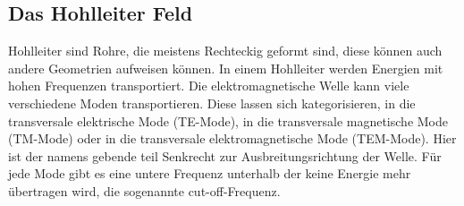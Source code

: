 \subsection{Das Hohlleiter Feld}
Hohlleiter sind Rohre, die meistens Rechteckig geformt sind, diese können auch andere Geometrien aufweisen können. In einem Hohlleiter werden Energien mit hohen Frequenzen transportiert. Die elektromagnetische Welle kann viele verschiedene Moden transportieren. Diese lassen sich kategorisieren, in die transversale elektrische Mode (TE-Mode), in die transversale magnetische Mode (TM-Mode) oder in die transversale elektromagnetische Mode (TEM-Mode). Hier ist der namens gebende teil Senkrecht zur Ausbreitungsrichtung der Welle. Für jede Mode gibt es eine untere Frequenz unterhalb der keine Energie mehr übertragen wird, die sogenannte cut-off-Frequenz.

